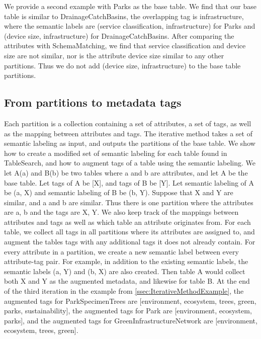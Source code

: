 We provide a second example with Parks as the base table. We find that our base table is similar to DrainageCatchBasins, the overlapping tag is infrastructure, where the semantic labels are (service classification, infrastructure) for Parks and (device size, infrastructure) for DrainageCatchBasins. After comparing the attributes with SchemaMatching, we find that
service classification and device size are not similar, nor is the attribute device size similar to any other partitions. Thus we do not add (device size, infrastructure) to the base table partitions.

\subsection{From partitions to metadata tags}
\label{ssec:FromPartitionsToMetadataTags}

Each partition is a collection containing a set of attributes, a set of tags, as well as the mapping between attributes and tags. The iterative method takes a set of semantic labeling as input, and outputs the partitions of the base table. We show how to create a modified set of semantic labeling for each table found in TableSearch, and how to augment tags of a table using the semantic labeling. We let A(a) and B(b) be two tables where a and b are attributes, and let A be the base table. Let tags of A be [X], and tags of B be [Y]. Let semantic labeling of A be {(a, X)} and semantic labeling of B be {(b, Y)}. Suppose that X and Y are similar, and a and b are similar. Thus there is one partition where the attributes are {a, b} and the tags are {X, Y}. We also keep track of the mappings between attributes and tags as well as which table an attribute originates from. For each table, we collect all tags in all partitions where its attributes are assigned to, and augment the tables tags with any additional tags it does not already contain. For every attribute in a partition, we create a new semantic label between every attribute-tag pair. For example, in addition to the existing semantic labels, the semantic labels (a, Y) and (b, X) are also created. Then table A would collect both X and Y as the augmented metadata, and likewise for table B.
At the end of the third iteration in the example from \autoref{ssec:IterativeMethodExample}, the augmented tags for ParkSpecimenTrees are [environment, ecosystem, trees, green, parks, sustainability], the augmented tags for Park are [environment, ecosystem, parks], and the augmented tags for GreenInfrastructureNetwork are [environment, ecosystem, trees, green].

